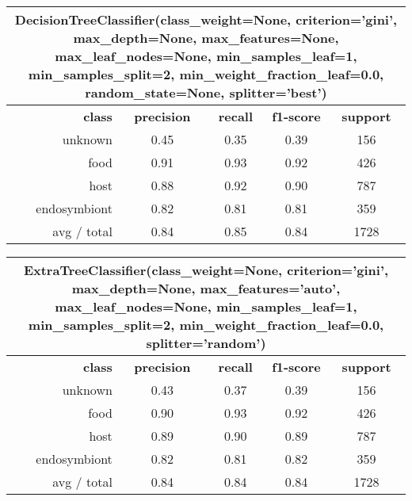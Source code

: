 \begin{table}
	\begin{tabular}{|r|c|c|c|c|}
		\hline
		\multicolumn{5}{c}{DecisionTreeClassifier(class\_weight=None, criterion='gini', max\_depth=None,
			max\_features=None, max\_leaf\_nodes=None, min\_samples\_leaf=1,
			min\_samples\_split=2, min\_weight\_fraction\_leaf=0.0,
			random\_state=None, splitter='best')}\\
		\hline
		\textbf{class}		& \textbf{precision}  &  \textbf{recall}  & \textbf{f1-score}  &  \textbf{support} \\
		unknown   	&    0.45 	 &   0.35   &    0.39   &   156   \\
		food      	&    0.91 	 &   0.93   &    0.92   &   426   \\
		host      	&    0.88    &   0.92   &    0.90   &   787   \\
		endosymbiont&    0.82    &   0.81   &    0.81   &   359   \\
		\hline
		avg / total &    0.84    &   0.85   &    0.84   &   1728  \\
		\hline
	\end{tabular}
\end{table}



\begin{table}
	\begin{tabular}{|r|c|c|c|c|}
		\hline
		\multicolumn{5}{c}{ExtraTreeClassifier(class\_weight=None, criterion='gini', max\_depth=None,
			max\_features='auto', max\_leaf\_nodes=None, min\_samples\_leaf=1,
			min\_samples\_split=2, min\_weight\_fraction\_leaf=0.0, splitter='random')}\\
		\hline
		\textbf{class}		& \textbf{precision}  &  \textbf{recall}  & \textbf{f1-score}  &  \textbf{support} \\
		unknown   	&    0.43 	 &   0.37   &    0.39   &   156   \\
		food      	&    0.90 	 &   0.93   &    0.92   &   426   \\
		host      	&    0.89    &   0.90   &    0.89   &   787   \\
		endosymbiont&    0.82    &   0.81   &    0.82   &   359   \\
		\hline
		avg / total &    0.84    &   0.84   &    0.84   &   1728  \\
		\hline
	\end{tabular}
\end{table}



